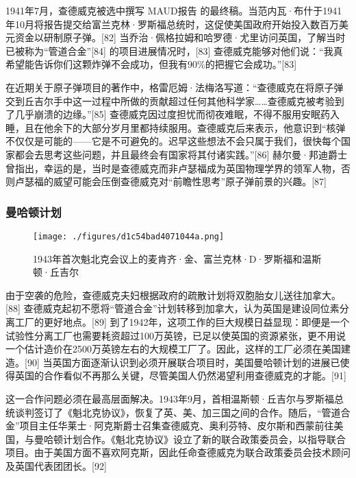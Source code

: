 1941年7月，查德威克被选中撰写 MAUD报告 的最终稿。当范内瓦·布什于1941年10月将报告提交给富兰克林·罗斯福总统时，这促使美国政府开始投入数百万美元资金以研制原子弹。[82] 当乔治·佩格拉姆和哈罗德·尤里访问英国，了解当时已被称为“管道合金”[84] 的项目进展情况时，[83] 查德威克能够对他们说：“我真希望能告诉你们这颗炸弹不会成功，但我有90\%的把握它会成功。”[83]

在近期关于原子弹项目的著作中，格雷厄姆·法梅洛写道：“查德威克在将原子弹交到丘吉尔手中这一过程中所做的贡献超过任何其他科学家……查德威克被考验到了几乎崩溃的边缘。”[85] 查德威克因过度担忧而彻夜难眠，不得不服用安眠药入睡，且在他余下的大部分岁月里都持续服用。查德威克后来表示，他意识到“核弹不仅仅是可能的——它是不可避免的。迟早这些想法不会只属于我们，很快每个国家都会去思考这些问题，并且最终会有国家将其付诸实践。”[86] 赫尔曼·邦迪爵士曾指出，幸运的是，当时是查德威克而非卢瑟福成为英国物理学界的领军人物，否则卢瑟福的威望可能会压倒查德威克对“前瞻性思考”原子弹前景的兴趣。[87]
\subsubsection{曼哈顿计划}
\begin{figure}[ht]
\centering
\texttt{[image: ./figures/d1c54bad4071044a.png]}
\caption{1943年首次魁北克会议上的麦肯齐·金、富兰克林·D·罗斯福和温斯顿·丘吉尔} \label{fig_ZMcdw_6}
\end{figure}
由于空袭的危险，查德威克夫妇根据政府的疏散计划将双胞胎女儿送往加拿大。[88] 查德威克起初不愿将“管道合金”计划转移到加拿大，认为英国是建设同位素分离工厂的更好地点。[89] 到了1942年，这项工作的巨大规模日益显现：即便是一个试验性分离工厂也需要耗资超过100万英镑，已足以使英国的资源紧张，更不用说一个估计造价在2500万英镑左右的大规模工厂了。因此，这样的工厂必须在美国建造。[90] 当英国方面逐渐认识到必须开展联合项目时，美国曼哈顿计划的进展已使得英国的合作看似不再那么关键，尽管美国人仍然渴望利用查德威克的才能。[91]

这一合作问题必须在最高层面解决。1943年9月，首相温斯顿·丘吉尔与罗斯福总统谈判签订了《魁北克协议》，恢复了英、美、加三国之间的合作。随后，“管道合金”项目主任华莱士·阿克斯爵士召集查德威克、奥利芬特、皮尔斯和西蒙前往美国，与曼哈顿计划合作。《魁北克协议》设立了新的联合政策委员会，以指导联合项目。由于美国方面不喜欢阿克斯，因此任命查德威克为联合政策委员会技术顾问及英国代表团团长。[92]


